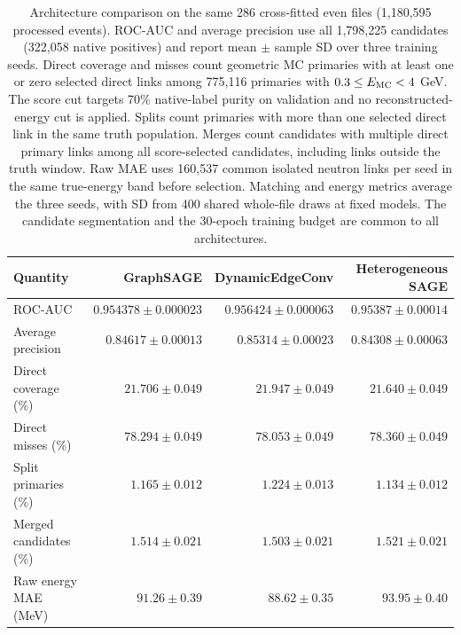 \begin{table}[!tp]
\centering
\caption{Architecture comparison on the same 286 cross-fitted \SMASH{} even files (1{,}180{,}595 processed events). ROC-AUC and average precision use all 1{,}798{,}225 candidates (322{,}058 native positives) and report mean $\pm$ sample SD over three training seeds. Direct coverage and misses count geometric MC primaries with at least one or zero selected direct links among 775{,}116 primaries with $0.3\leq E_{\rm MC}<4$ GeV. The score cut targets 70\% native-label purity on validation and no reconstructed-energy cut is applied. Splits count primaries with more than one selected direct link in the same truth population. Merges count candidates with multiple direct primary links among all score-selected candidates, including links outside the truth window. Raw MAE uses 160{,}537 common isolated neutron links per seed in the same true-energy band before selection. Matching and energy metrics average the three seeds, with SD from 400 shared whole-file draws at fixed models. The candidate segmentation and the 30-epoch training budget are common to all architectures.}
\label{tab:architecture-reconstruction}
\begin{tabular}{lrrr}
\toprule
Quantity & GraphSAGE & DynamicEdgeConv & Heterogeneous SAGE\\
\midrule
ROC-AUC & $0.954378\pm0.000023$ & $0.956424\pm0.000063$ & $0.95387\pm0.00014$\\
Average precision & $0.84617\pm0.00013$ & $0.85314\pm0.00023$ & $0.84308\pm0.00063$\\
Direct coverage (\%) & $21.706\pm0.049$ & $21.947\pm0.049$ & $21.640\pm0.049$\\
Direct misses (\%) & $78.294\pm0.049$ & $78.053\pm0.049$ & $78.360\pm0.049$\\
Split primaries (\%) & $1.165\pm0.012$ & $1.224\pm0.013$ & $1.134\pm0.012$\\
Merged candidates (\%) & $1.514\pm0.021$ & $1.503\pm0.021$ & $1.521\pm0.021$\\
Raw energy MAE (MeV) & $91.26\pm0.39$ & $88.62\pm0.35$ & $93.95\pm0.40$\\
\bottomrule
\end{tabular}
\end{table}
